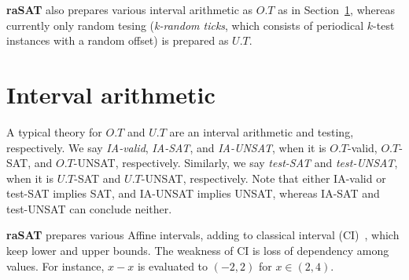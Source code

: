 \documentclass[runningheads,a4paper,oribibl]{llncs}
\newcommand{\Real}{{\mathbb R}}
\newcommand{\suppress}[1]{} %
\begin{document}
{\bf raSAT} also prepares various interval arithmetic as $O.T$ as in Section~\ref{sec:approximation}, 
whereas currently only random tesing (\emph{k-random ticks}, 
which consists of periodical $k$-test instances with a random offset) is prepared as $U.T$. 


\section{Interval arithmetic} \label{sec:approximation}

A typical theory for $O.T$ and $U.T$ are an interval arithmetic and testing, respectively. 
We say {\em IA-valid}, {\em IA-SAT}, and {\em IA-UNSAT}, when it is $O.T$-valid, $O.T$-SAT, and 
$O.T$-UNSAT, respectively. 
Similarly, we say {\em test-SAT} and {\em test-UNSAT}, when it is $U.T$-SAT and $U.T$-UNSAT, respectively. 
Note that either IA-valid or test-SAT implies SAT, and IA-UNSAT implies UNSAT, 
whereas IA-SAT and test-UNSAT can conclude neither. 


\suppress{
\begin{definition}\label{def:testing}
Let $M = \bigwedge \limits_{i=1}^m x_i \in (a_i,b_i)$ and 
${\mathcal P} = \bigwedge \limits_{i=1}^m f_i(x_1,\cdots,x_n) > 0$. 
%
Let a choice function $\theta : (\Real \times \Real)^n \rightarrow \Real^n$ 
such that $\theta(M) \in (a_1,b_1) \times \cdots \times (a_n,b_n)$. 
Testing is a finite set $\Theta$ of choice functions. Then, we say 
\begin{itemize}
\item ${\mathcal P}$ is \emph{Test-SAT} under $M$ if $\theta(M)$ holds ${\mathcal P}$ 
for some $\theta \in \Theta$, and 
\item ${\mathcal P}$ is \emph{Test-UNSAT} under $M$ if $\theta(M)$ never holds ${\mathcal P}$ 
for each $\theta \in \Theta$. 
\end{itemize} 
\end{definition}
}


{\bf raSAT} prepares various Affine intervals, adding to classical interval (CI)~\cite{moore}, 
which keep lower and upper bounds. The weakness of CI is loss of dependency 
among values. For instance, $x - x$ is evaluated to $(-2,2)$ for $x \in (2,4)$. 
\end{document}

